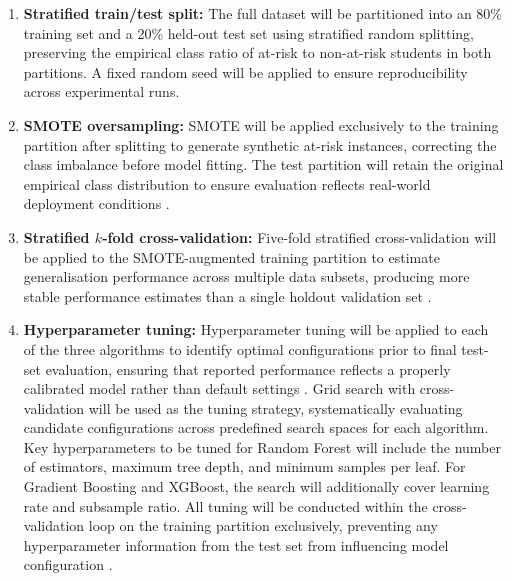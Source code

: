 \documentclass[12pt]{report}
\begin{document}
\begin{enumerate}
    \item \textbf{Stratified train/test split:} The full dataset will be partitioned
    into an 80\% training set and a 20\% held-out test set using stratified
    random splitting, preserving the empirical class ratio of at-risk to
    non-at-risk students in both partitions. A fixed random seed will be applied
    to ensure reproducibility across experimental runs.

    \item \textbf{SMOTE oversampling:} SMOTE will be applied exclusively to the
    training partition after splitting to generate synthetic at-risk instances,
    correcting the class imbalance before model fitting. The test partition will
    retain the original empirical class distribution to ensure evaluation
    reflects real-world deployment conditions \parencite{chawla2002smote}.

    \item \textbf{Stratified $k$-fold cross-validation:} Five-fold stratified
    cross-validation will be applied to the SMOTE-augmented training partition to
    estimate generalisation performance across multiple data subsets, producing
    more stable performance estimates than a single holdout validation set
    \parencite{bettahi2025}.

    \item \textbf{Hyperparameter tuning:} Hyperparameter tuning will be applied to
     each of the three algorithms to identify optimal configurations prior to final 
     test-set evaluation, ensuring that reported performance reflects a properly
      calibrated model rather than default settings \parencite{esmael2024,
       bettahi2025}. Grid search with cross-validation will be used as 
       the tuning strategy, systematically evaluating candidate configurations
        across predefined search spaces for each algorithm. Key hyperparameters
         to be tuned for Random Forest will include the number of estimators,
          maximum tree depth, and minimum samples per leaf. For Gradient Boosting
           and XGBoost, the search will additionally cover learning rate and subsample 
           ratio. All tuning will be conducted within the cross-validation loop on the 
           training partition exclusively, preventing any hyperparameter information
            from the test set from influencing model configuration \parencite{esmael2024}.
\end{enumerate}
\end{document}

